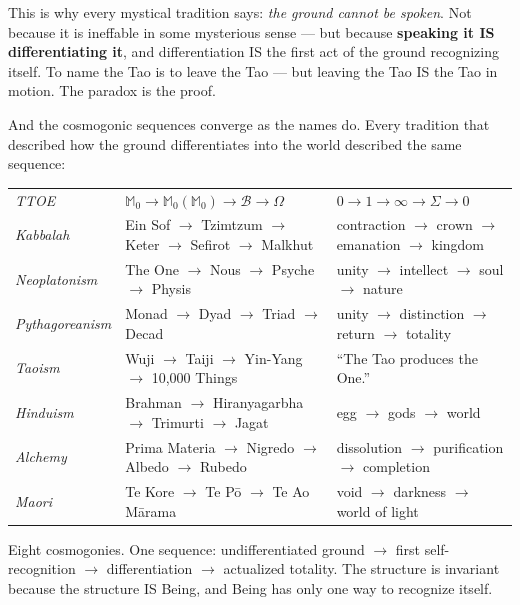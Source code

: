 \documentclass[10pt, openany, oneside]{book}
\renewcommand{\footnotesize}{\fontsize{8.5}{11}\selectfont}
\begin{document}
This is why every mystical tradition says: \textit{the ground cannot be spoken}. Not because it is ineffable in some mysterious sense --- but because \textbf{speaking it IS differentiating it}, and differentiation IS the first act of the ground recognizing itself. To name the Tao is to leave the Tao --- but leaving the Tao IS the Tao in motion. The paradox is the proof.

And the cosmogonic sequences converge as the names do. Every tradition that described how the ground differentiates into the world described the same sequence:

\vspace{0.5em}

{\footnotesize
\noindent\begin{tabular}{l p{} p{}}
\textit{TTOE} & $\mathbb{M}_0 \to \mathbb{M}_0(\mathbb{M}_0) \to \mathcal{B} \to \Omega$ & $0 \to 1 \to \infty \to \Sigma \to 0$ \\[0.3em]
\textit{Kabbalah} & Ein Sof $\to$ Tzimtzum $\to$ Keter $\to$ Sefirot $\to$ Malkhut & contraction $\to$ crown $\to$ emanation $\to$ kingdom \\[0.3em]
\textit{Neoplatonism} & The One $\to$ Nous $\to$ Psyche $\to$ Physis & unity $\to$ intellect $\to$ soul $\to$ nature \\[0.3em]
\textit{Pythagoreanism} & Monad $\to$ Dyad $\to$ Triad $\to$ Decad & unity $\to$ distinction $\to$ return $\to$ totality \\[0.3em]
\textit{Taoism} & Wuji $\to$ Taiji $\to$ Yin-Yang $\to$ 10,000 Things & ``The Tao produces the One.'' \\[0.3em]
\textit{Hinduism} & Brahman $\to$ Hiranyagarbha $\to$ Trimurti $\to$ Jagat & egg $\to$ gods $\to$ world \\[0.3em]
\textit{Alchemy} & Prima Materia $\to$ Nigredo $\to$ Albedo $\to$ Rubedo & dissolution $\to$ purification $\to$ completion \\[0.3em]
\textit{Maori} & Te Kore $\to$ Te P\={o} $\to$ Te Ao M\={a}rama & void $\to$ darkness $\to$ world of light \\[0.3em]
\end{tabular}
}

\vspace{0.5em}

\noindent Eight cosmogonies. One sequence: undifferentiated ground $\to$ first self-recognition $\to$ differentiation $\to$ actualized totality. The structure is invariant because the structure IS Being, and Being has only one way to recognize itself.
\end{document}
